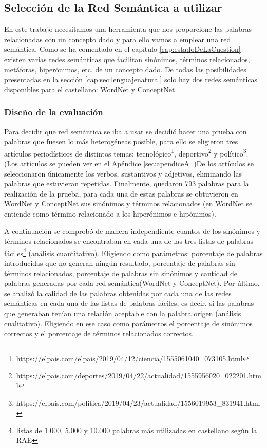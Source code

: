 \subsection{Selección de la Red Semántica a utilizar}
\label{cap:subsec:redsemanticautilizada}

En este trabajo necesitamos una herramienta que nos proporcione las palabras relacionadas con un concepto dado y para ello vamos a emplear una red semántica.
Como se ha comentado en el capítulo \ref{cap:estadoDeLaCuestion} existen varias redes semánticas que facilitan sinónimos, términos relacionados, metáforas, hiperónimos, etc. de un concepto dado. 
De todas las posibilidades presentadas en la sección \ref{cap:sec:lenguajenatural} solo hay dos redes semánticas disponibles para el castellano: WordNet y ConceptNet. 


\subsubsection{Diseño de la evaluación}
\label{cap:subsec:disenioeval}


Para decidir que red semántica se iba a usar se decidió hacer una prueba con palabras que fuesen lo más heterogéneas posible, para ello se eligieron tres artículos periodísticos de distintos temas: tecnológico\footnote{https://elpais.com/elpais/2019/04/12/ciencia/1555061040\_073105.html}, deportivo\footnote{https://elpais.com/deportes/2019/04/22/actualidad/1555956020\_022201.html} y político\footnote{https://elpais.com/politica/2019/04/23/actualidad/1556019953\_831941.html}. (Los artículos se pueden ver en el Apéndice \ref{sec:apendiceA} )De los artículos se seleccionaron únicamente los verbos, sustantivos y adjetivos, eliminando las palabras que estuvieran repetidas. Finalmente, quedaron 793 palabras para la realización de la prueba, para cada una de estas palabras se obtuvieron en WordNet y ConceptNet sus sinónimos y términos relacionados (en WordNet se entiende como término relacionado a los hiperónimos e hipónimos).

A continuación se comprobó de manera independiente cuantos de los sinónimos y términos relacionados se encontraban en cada una de las tres listas de palabras fáciles\footnote{listas de 1.000, 5.000 y 10.000 palabras más utilizadas en castellano según la RAE} (análisis cuantitativo). Eligiendo como parámetros: porcentaje de palabras introducidas que no generan ningún resultado, porcentaje de palabras sin términos relacionados, porcentaje de palabras sin sinónimos  y cantidad de palabras generadas por cada red semántica(WordNet y ConceptNet). Por último, se analizó la calidad de las palabras obtenidas por cada una de las redes semánticas en cada una de las listas de palabras fáciles, es decir, si las palabras que generaban tenían una relación aceptable con la palabra origen (análisis cualitativo). Eligiendo en ese caso como parámetros el porcentaje de sinónimos correctos y el porcentaje de términos relacionados correctos.

